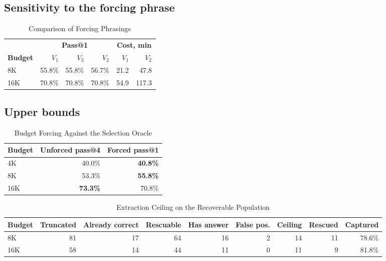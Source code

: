 \documentclass[conference]{IEEEtran}
\newif\ifdraft
\newcommand{\writehere}[2]{%
  \ifdraft
    {\color{orange!75!black}\small\textbf{[WRITE: #1]}\itshape\ #2\par}
    \medskip
  \fi}
\begin{document}
\subsection{Sensitivity to the forcing phrase}

\begin{table}[t]
\caption{Comparison of Forcing Phrasings}
\label{tab:variants}
\centering
\footnotesize
\begin{tabular}{@{}lrrr@{\hspace{1.2em}}rr@{}}
\toprule
& \multicolumn{3}{c}{\textbf{Pass@1}} & \multicolumn{2}{c}{\textbf{Cost, min}} \\
\cmidrule(lr){2-4}\cmidrule(l){5-6}
\textbf{Budget} & $V_1$ & $V_3$ & $V_2$ & $V_1$ & $V_2$ \\
\midrule
8K  & 55.8\% & 55.8\% & 56.7\% & 21.2 & 47.8 \\
16K & 70.8\% & 70.8\% & 70.8\% & 54.9 & 117.3 \\
\bottomrule
\end{tabular}
\end{table}

\writehere{1 paragraph, factual}{
Identical at 16K. The 0.9 point lead at 8K is one sample out of 120. $V_2$ costs
2.1 times more compute at both budgets.}

\subsection{Upper bounds}

\begin{table}[t]
\caption{Budget Forcing Against the Selection Oracle}
\label{tab:oracle}
\centering
\footnotesize
\begin{tabular}{@{}lrr@{}}
\toprule
\textbf{Budget} & \textbf{Unforced pass@4} & \textbf{Forced pass@1} \\
\midrule
4K  & 40.0\% & \textbf{40.8\%} \\
8K  & 53.3\% & \textbf{55.8\%} \\
16K & \textbf{73.3\%} & 70.8\% \\
\bottomrule
\end{tabular}
\end{table}

\begin{table}[t]
\caption{Extraction Ceiling on the Recoverable Population}
\label{tab:ceiling}
\centering
\footnotesize
\begin{tabular}{@{}lrrrrrrrr@{}}
\toprule
\textbf{Budget} & \textbf{Truncated} & \textbf{Already correct} &
\textbf{Rescuable} & \textbf{Has answer} & \textbf{False pos.} &
\textbf{Ceiling} & \textbf{Rescued} & \textbf{Captured} \\
\midrule
8K  & 81 & 17 & 64 & 16 & 2 & 14 & 11 & 78.6\% \\
16K & 58 & 14 & 44 & 11 & 0 & 11 &  9 & 81.8\% \\
\bottomrule
\end{tabular}
\end{table}
\end{document}
